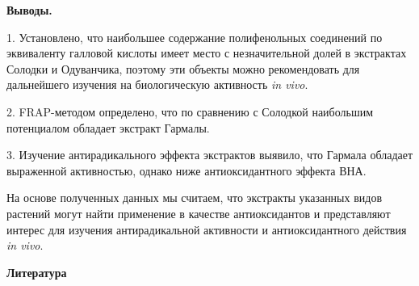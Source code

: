 {\bfseries Выводы.}

1. Установлено, что наибольшее содержание полифенольных соединений по
эквиваленту галловой кислоты имеет место с незначительной долей в
экстрактах Солодки и Одуванчика, поэтому эти объекты можно рекомендовать
для дальнейшего изучения на биологическую активность \emph{in vivo}.

2. FRAP-методом определено, что по сравнению с Солодкой наибольшим
потенциалом обладает экстракт Гармалы.

3. Изучение антирадикального эффекта экстрактов выявило, что Гармала
обладает выраженной активностью, однако ниже антиоксидантного эффекта
ВНА.

На основе полученных данных мы считаем, что экстракты указанных видов
растений могут найти применение в качестве антиоксидантов и представляют
интерес для изучения антирадикальной активности и антиоксидантного
действия \emph{in vivo}.

{\bfseries Литература}

